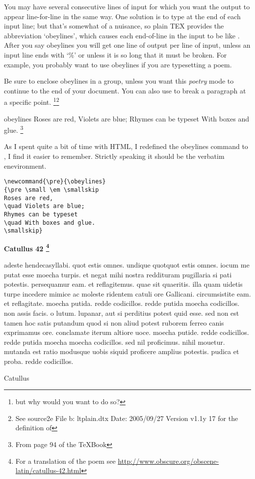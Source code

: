 \begin{macro}{\obeylines}
You may have several consecutive lines of input for which you want the output
to appear line-for-line in the same way. One solution is to type  at the
end of each input line; but that's somewhat of a nuisance, so plain TEX provides the
abbreviation `obeylines', which causes each end-of-line in the input to be like .
After you say obeylines you will get one line of output per line of input, unless an
input line ends with `\%' or unless it is so long that it must be broken. For example, you
probably want to use obeylines if you are typesetting a poem. 
\end{macro}

Be sure to enclose
obeylines in a group, unless you want this \textit{poetry} mode to continue to the end of
your document.  You can also use  to break a paragraph at a specific point.  \footnote{but why would you want to do so?}\footnote{See source2e File b: ltplain.dtx Date: 2005/09/27 Version v1.1y 17 for the definition of }

\begin{texexample}{obeylines}{}
\obeylines
Roses are red, 
\quad Violets are blue; 
Rhymes can be typeset
\quad With boxes and glue. \footnote{From page 94 of the TeXBook} 

\end{texexample}

As I spent quite a bit of time with HTML, I redefined the obeylines command to , I find it easier to remember. Strictly speaking it should be the verbatim enevironment.

{\small
\begin{verbatim}
\newcommand{\pre}{\obeylines}
{\pre \small \em \smallskip
Roses are red,
\quad Violets are blue;
Rhymes can be typeset
\quad With boxes and glue.
\smallskip}
\end{verbatim}
}



{\obeylines
{\Large\bf  Catullus 42 \footnote{For a translation of the poem see \url{http://www.obscure.org/obscene-latin/catullus-42.html}}}

adeste hendecasyllabi. quot estis 
omnes. undique quotquot estis omnes. 
iocum me putat esse moecha turpis. 
et negat mihi nostra reddituram 
pugillaria si pati potestis. 
persequamur eam. et reflagitemus. 
quae sit quaeritis. illa quam uidetis 
turpe incedere mimice ac moleste 
ridentem catuli ore Gallicani. 
circumsistite eam. et reflagitate. 
moecha putida. redde codicillos. 
redde putida moecha codicillos. 
non assis facis. o lutum. lupanar, 
aut si perditius potest quid esse. 
sed non est tamen hoc satis putandum 
quod si non aliud potest ruborem 
ferreo canis exprimamus ore. 
conclamate iterum altiore uoce. 
moecha putide. redde codicillos. 
redde putida moecha moecha codicillos. 
sed nil proficimus. nihil mouetur. 
mutanda est ratio modusque uobis 
siquid proficere amplius potestis. 
pudica et proba. redde codicillos.


\hfil Catullus\par}



